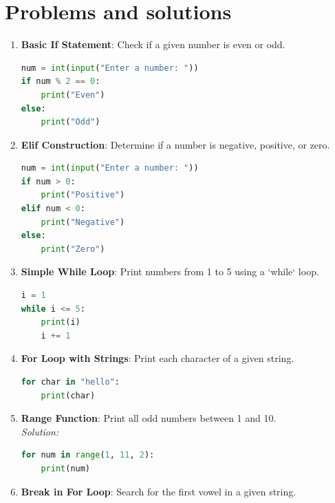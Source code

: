 \documentclass[12pt]{book}
\begin{document}
\newpage
\section{Problems and solutions}

\begin{enumerate}
    \item \textbf{Basic If Statement}: Check if a given number is even or odd. \\

    \begin{lstlisting}[language=Python]
num = int(input("Enter a number: "))
if num % 2 == 0:
    print("Even")
else:
    print("Odd")
    \end{lstlisting}

    \item \textbf{Elif Construction}: Determine if a number is negative, positive, or zero. \\

    \begin{lstlisting}[language=Python]
num = int(input("Enter a number: "))
if num > 0:
    print("Positive")
elif num < 0:
    print("Negative")
else:
    print("Zero")
    \end{lstlisting}

    \item \textbf{Simple While Loop}: Print numbers from 1 to 5 using a `while` loop. \\

    \begin{lstlisting}[language=Python]
i = 1
while i <= 5:
    print(i)
    i += 1
    \end{lstlisting}

    \item \textbf{For Loop with Strings}: Print each character of a given string. \\

    \begin{lstlisting}[language=Python]
for char in "hello":
    print(char)
    \end{lstlisting}

    \item \textbf{Range Function}: Print all odd numbers between 1 and 10. \\
    \textit{Solution:}
    \begin{lstlisting}[language=Python]
for num in range(1, 11, 2):
    print(num)
    \end{lstlisting}

    \item \textbf{Break in For Loop}: Search for the first vowel in a given string. \\


\end{enumerate}
\end{document}
